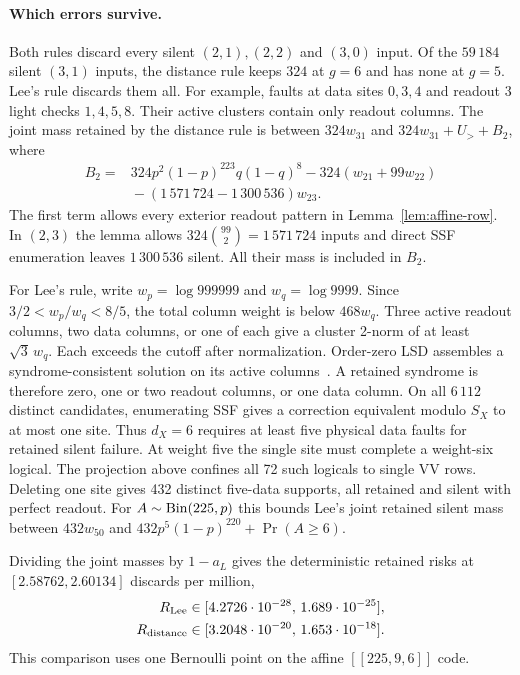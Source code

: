 \documentclass[10pt,twocolumn]{article}
\theoremstyle{definition}
\begin{document}
\paragraph{Which errors survive.}
Both rules discard every silent $(2,1),(2,2)$ and $(3,0)$ input.
Of the $59\,184$ silent $(3,1)$ inputs, the distance rule keeps
$324$ at $g=6$ and has none at $g=5$. Lee's rule discards them all.
For example, faults at data sites $0,3,4$ and readout $3$ light
checks $1,4,5,8$. Their active clusters contain only readout columns.
The joint mass retained by the distance rule is between $324w_{31}$
and $324w_{31}+U_>+B_2$, where
\[
\begin{aligned}
 B_2={}&324p^2(1-p)^{223}q(1-q)^8-324(w_{21}+99w_{22})\\
       &{}-(1\,571\,724-1\,300\,536)w_{23}.
\end{aligned}
\]
The first term allows every exterior readout pattern in
Lemma~\ref{lem:affine-row}. In $(2,3)$ the lemma allows
$324\binom{99}{2}=1\,571\,724$ inputs and direct SSF enumeration
leaves $1\,300\,536$ silent. All their mass is included in $B_2$.

For Lee's rule, write $w_p=\log 999999$ and $w_q=\log 9999$.
Since $3/2<w_p/w_q<8/5$, the total column weight is below $468w_q$.
Three active readout columns, two data columns, or one of each give
a cluster 2-norm of at least $\sqrt{3}\,w_q$. Each exceeds the cutoff
after normalization. Order-zero LSD assembles a syndrome-consistent
solution on its active columns~\cite[Methods]{LEB26}. A retained
syndrome is therefore zero, one or two readout columns, or one data
column. On all $6\,112$ distinct candidates, enumerating SSF gives a
correction equivalent modulo $S_X$ to at most one site. Thus
$d_X=6$ requires at least five physical data faults for retained
silent failure. At weight five the single site must complete a
weight-six logical. The projection above confines all 72 such
logicals to single VV rows. Deleting one site gives 432 distinct
five-data supports, all retained and silent with perfect readout.
For $A\sim{\rm Bin}(225,p)$ this bounds Lee's joint retained silent
mass between $432w_{50}$ and
$432p^5(1-p)^{220}+\Pr(A\ge6)$.

Dividing the joint masses by $1-a_L$ gives the deterministic retained
risks at $[2.58762,2.60134]$ discards per million,
\[
\begin{aligned}
 R_{\rm Lee}&\in[4.2726\cdot10^{-28},\,1.689\cdot10^{-25}],\\
 R_{\rm distance}&\in[3.2048\cdot10^{-20},\,1.653\cdot10^{-18}].
\end{aligned}
\]
This comparison uses one Bernoulli point on the affine $[[225,9,6]]$ code.
\end{document}
